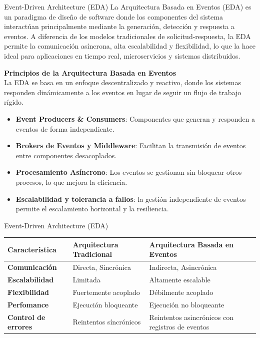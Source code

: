 \documentclass[11pt]{beamer}
\begin{document}
	\begin{frame}{Event-Driven Architecture (EDA)}
	\small
	La Arquitectura Basada en Eventos (EDA) es un paradigma de diseño de software donde los componentes del sistema interactúan principalmente mediante la generación, detección y respuesta a eventos. A diferencia de los modelos tradicionales de solicitud-respuesta, la EDA permite la comunicación asíncrona, alta escalabilidad y flexibilidad, lo que la hace ideal para aplicaciones en tiempo real, microservicios y sistemas distribuidos.
	
	\textbf{Principios de la Arquitectura Basada en Eventos}\\
	La EDA se basa en un enfoque descentralizado y reactivo, donde los sistemas responden dinámicamente a los eventos en lugar de seguir un flujo de trabajo rígido. \\
	
	\begin{itemize}
		\item \textbf{Event Producers \& Consumers}: Componentes que generan y responden a eventos de forma independiente.
		\item \textbf{Brokers de Eventos y Middleware}: Facilitan la transmisión de eventos entre componentes desacoplados.
		\item \textbf{Procesamiento Asíncrono}: Los eventos se gestionan sin bloquear otros procesos, lo que mejora la eficiencia. 
		\item \textbf{Escalabilidad y tolerancia a fallos}: la gestión independiente de eventos permite el escalamiento horizontal y la resiliencia.
	\end{itemize}
	\end{frame}
	
	\begin{frame}{Event-Driven Architecture (EDA)}
		\begin{table}
		\centering
		\renewcommand{\arraystretch}{1.2}
		\begin{tabular}{|p{3cm}|p{4cm}|p{4cm}|}
			\hline
			\textbf{Característica} & \textbf{Arquitectura Tradicional} & \textbf{Arquitectura Basada en Eventos} \\ \hline
			\textbf{Comunicación} & Directa, Sincrónica & Indirecta, Asincrónica \\ \hline
			\textbf{Escalabilidad} & Limitada & Altamente escalable \\ \hline
			\textbf{Flexibilidad} & Fuertemente acoplado & Débilmente acoplado \\ \hline
			\textbf{Perfomance} & Ejecución bloqueante & Ejecución no bloqueante \\ \hline
			\textbf{Control de errores} & Reintentos síncrónicos & Reintentos asincrónicos con registros de eventos \\ \hline
			\end{tabular}
		\end{table}
	\end{frame}
	
\end{document}
